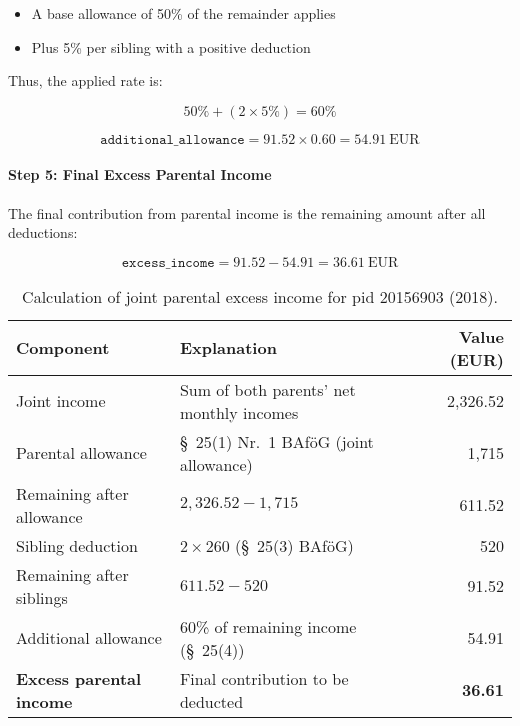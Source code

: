 \begin{itemize}
    \item A base allowance of 50\% of the remainder applies
    \item Plus 5\% per sibling with a positive deduction
\end{itemize}



Thus, the applied rate is:

\[
50\% + (2 \times 5\%) = 60\%
\]

\[
\texttt{additional\_allowance} = 91.52 \times 0.60 = 54.91~\text{EUR}
\]

\paragraph{Step 5: Final Excess Parental Income}

The final contribution from parental income is the remaining amount after all deductions:

\[
\texttt{excess\_income} = 91.52 - 54.91 = 36.61~\text{EUR}
\]

\begin{table}[H]
\footnotesize
\centering
\begin{tabularx}{\textwidth}{lXr}
\toprule
\textbf{Component} & \textbf{Explanation} & \textbf{Value (EUR)} \\
\midrule
Joint income & Sum of both parents’ net monthly incomes & 2,326.52 \\
Parental allowance & §~25(1) Nr.~1 BAföG (joint allowance) & 1,715 \\
Remaining after allowance & $2{,}326.52 - 1{,}715$ & 611.52 \\
Sibling deduction & $2 \times 260$ (§~25(3) BAföG) & 520 \\
Remaining after siblings & $611.52 - 520$ & 91.52 \\
Additional allowance & 60\% of remaining income (§~25(4)) & 54.91 \\
\midrule
\textbf{Excess parental income} & Final contribution to be deducted & \textbf{36.61} \\
\bottomrule
\end{tabularx}
\caption{Calculation of joint parental excess income for pid 20156903 (2018).}
\label{table:bafoeg_joint_income}
\end{table}


